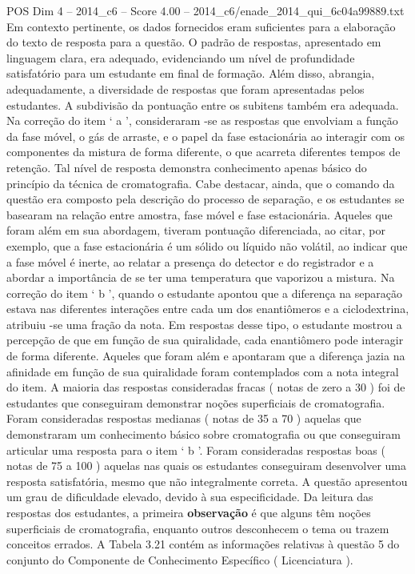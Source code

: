 \begin{textsample}{POS Dim 4 – 2014\_c6 – Score 4.00 – 2014\_c6/enade\_2014\_qui\_6c04a99889.txt}
Em contexto pertinente, os dados fornecidos eram suficientes para a elaboração do texto de resposta para a questão.
O padrão de respostas, apresentado em linguagem clara, era adequado, evidenciando um nível de profundidade satisfatório para um estudante em final de formação.
Além disso, abrangia, adequadamente, a diversidade de respostas que foram apresentadas pelos estudantes.
A subdivisão da pontuação entre os subitens também era adequada.
Na correção do item ‘ a ’, consideraram -se as respostas que envolviam a função da fase móvel, o gás de arraste, e o papel da fase estacionária ao interagir com os componentes da mistura de forma diferente, o que acarreta diferentes tempos de retenção.
Tal nível de resposta demonstra conhecimento apenas básico do princípio da técnica de cromatografia.
Cabe destacar, ainda, que o comando da questão era composto pela descrição do processo de separação, e os estudantes se basearam na relação entre amostra, fase móvel e fase estacionária.
Aqueles que foram além em sua abordagem, tiveram pontuação diferenciada, ao citar, por exemplo, que a fase estacionária é um sólido ou líquido não volátil, ao indicar que a fase móvel é inerte, ao relatar a presença do detector e do registrador e a abordar a importância de se ter uma temperatura que vaporizou a mistura.
Na correção do item ‘ b ’, quando o estudante apontou que a diferença na separação estava nas diferentes interações entre cada um dos enantiômeros e a ciclodextrina, atribuiu -se uma fração da nota.
Em respostas desse tipo, o estudante mostrou a percepção de que em função de sua quiralidade, cada enantiômero pode interagir de forma diferente.
Aqueles que foram além e apontaram que a diferença jazia na afinidade em função de sua quiralidade foram contemplados com a nota integral do item.
A maioria das respostas consideradas fracas ( notas de zero a 30 ) foi de estudantes que conseguiram demonstrar noções superficiais de cromatografia.
Foram consideradas respostas medianas ( notas de 35 a 70 ) aquelas que demonstraram um conhecimento básico sobre cromatografia ou que conseguiram articular uma resposta para o item ‘ b ’.
Foram consideradas respostas boas ( notas de 75 a 100 ) aquelas nas quais os estudantes conseguiram desenvolver uma resposta satisfatória, mesmo que não integralmente correta.
A questão apresentou um grau de dificuldade elevado, devido à sua especificidade.
Da leitura das respostas dos estudantes, a primeira \textbf{observação} é que alguns têm noções superficiais de cromatografia, enquanto outros desconhecem o tema ou trazem conceitos errados.
A Tabela 3.21 contém as informações relativas à questão 5 do conjunto do Componente de Conhecimento Específico ( Licenciatura ).

\end{textsample}
